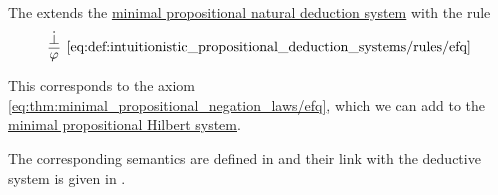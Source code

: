 \begin{definition}\label{def:intuitionistic_propositional_deduction_systems}
  The  extends the \hyperref[def:minimal_propositional_natural_deduction_system]{minimal propositional natural deduction system} with the rule
  \begin{equation*}\taglabel[\logic{EFQ}]{eq:def:intuitionistic_propositional_deduction_systems/rules/efq}
    \begin{prooftree}
      \hypo{ \synbot }
      \infer1[\ref{eq:def:intuitionistic_propositional_deduction_systems/rules/efq}]{ \varphi }
    \end{prooftree}
  \end{equation*}
\end{definition}
\begin{comments}
  \item This corresponds to the axiom \eqref{eq:thm:minimal_propositional_negation_laws/efq}, which we can add to the \hyperref[def:minimal_propositional_hilbert_system]{minimal propositional Hilbert system}.
  \item The corresponding semantics are defined in  and their link with the deductive system is given in .
\end{comments}

